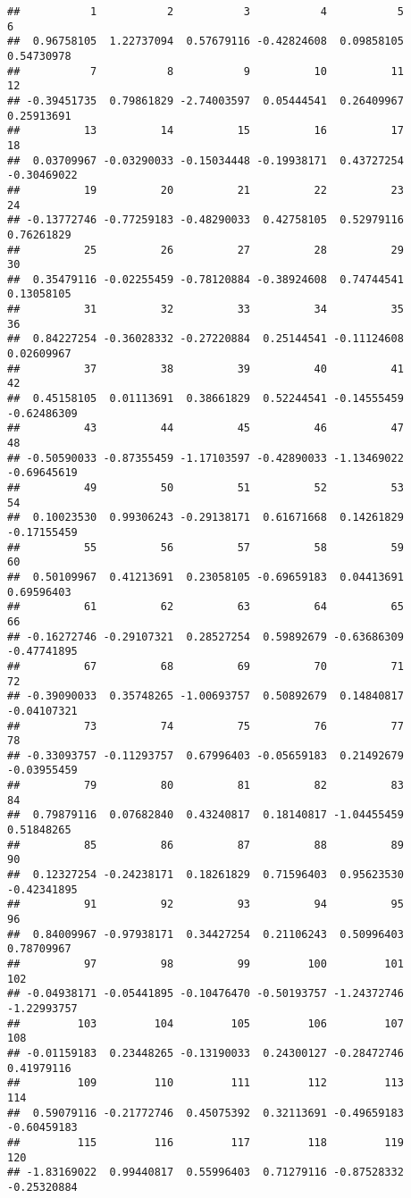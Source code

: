 \documentclass[
]{article}
\begin{document}
\begin{verbatim}
##           1           2           3           4           5           6 
##  0.96758105  1.22737094  0.57679116 -0.42824608  0.09858105  0.54730978 
##           7           8           9          10          11          12 
## -0.39451735  0.79861829 -2.74003597  0.05444541  0.26409967  0.25913691 
##          13          14          15          16          17          18 
##  0.03709967 -0.03290033 -0.15034448 -0.19938171  0.43727254 -0.30469022 
##          19          20          21          22          23          24 
## -0.13772746 -0.77259183 -0.48290033  0.42758105  0.52979116  0.76261829 
##          25          26          27          28          29          30 
##  0.35479116 -0.02255459 -0.78120884 -0.38924608  0.74744541  0.13058105 
##          31          32          33          34          35          36 
##  0.84227254 -0.36028332 -0.27220884  0.25144541 -0.11124608  0.02609967 
##          37          38          39          40          41          42 
##  0.45158105  0.01113691  0.38661829  0.52244541 -0.14555459 -0.62486309 
##          43          44          45          46          47          48 
## -0.50590033 -0.87355459 -1.17103597 -0.42890033 -1.13469022 -0.69645619 
##          49          50          51          52          53          54 
##  0.10023530  0.99306243 -0.29138171  0.61671668  0.14261829 -0.17155459 
##          55          56          57          58          59          60 
##  0.50109967  0.41213691  0.23058105 -0.69659183  0.04413691  0.69596403 
##          61          62          63          64          65          66 
## -0.16272746 -0.29107321  0.28527254  0.59892679 -0.63686309 -0.47741895 
##          67          68          69          70          71          72 
## -0.39090033  0.35748265 -1.00693757  0.50892679  0.14840817 -0.04107321 
##          73          74          75          76          77          78 
## -0.33093757 -0.11293757  0.67996403 -0.05659183  0.21492679 -0.03955459 
##          79          80          81          82          83          84 
##  0.79879116  0.07682840  0.43240817  0.18140817 -1.04455459  0.51848265 
##          85          86          87          88          89          90 
##  0.12327254 -0.24238171  0.18261829  0.71596403  0.95623530 -0.42341895 
##          91          92          93          94          95          96 
##  0.84009967 -0.97938171  0.34427254  0.21106243  0.50996403  0.78709967 
##          97          98          99         100         101         102 
## -0.04938171 -0.05441895 -0.10476470 -0.50193757 -1.24372746 -1.22993757 
##         103         104         105         106         107         108 
## -0.01159183  0.23448265 -0.13190033  0.24300127 -0.28472746  0.41979116 
##         109         110         111         112         113         114 
##  0.59079116 -0.21772746  0.45075392  0.32113691 -0.49659183 -0.60459183 
##         115         116         117         118         119         120 
## -1.83169022  0.99440817  0.55996403  0.71279116 -0.87528332 -0.25320884
\end{verbatim}
\end{document}
